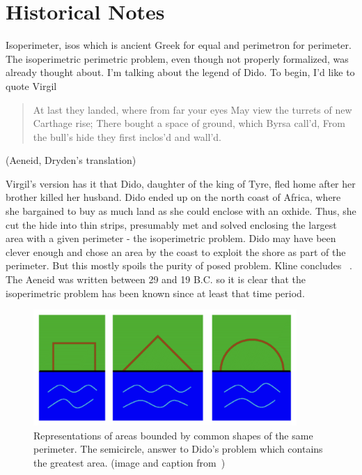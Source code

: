 \documentclass[a4paper]{book}
\begin{document}
\section*{Historical Notes}
Isoperimeter, isos which is ancient Greek for equal and perimetron for perimeter. The isoperimetric perimetric problem, even though not properly formalized, was already thought about. I'm talking about the legend of Dido. To begin, I'd like to quote Virgil
\begin{center}
    \begin{quote}
        At last they landed, where from far your eyes
        May view the turrets of new Carthage rise;
        There bought a space of ground, which Byrsa call'd,
        From the bull's hide they first inclos'd and wall'd.
    \end{quote}
    (Aeneid, Dryden’s translation)
\end{center}
Virgil's version has it that Dido, daughter of the king of Tyre, fled home after her brother killed her husband. Dido ended up on the north coast of Africa, where she bargained to buy as much land as she could enclose with an oxhide. Thus, she cut the hide into thin strips, presumably met and solved enclosing the largest area with a given perimeter - the isoperimetric problem. Dido may have been clever enough and chose an area by the coast to exploit the shore as part of the perimeter. But this mostly spoils the purity of posed problem. Kline concludes ~\cite{kline1985mathematics}. The Aeneid was written between 29 and 19 B.C. so it is clear that the isoperimetric problem has been known since at least that time period.
\begin{figure}[h]
    \begin{center}   
        \includegraphics[width=100mm]{dido_1}
        \caption{Representations of areas bounded by common shapes of the same perimeter. The semicircle, answer to Dido's problem which contains the greatest area. (image and caption from~\cite{demjanenko2008isoperimetric})}
    \end{center}
\end{figure}
\end{document}
